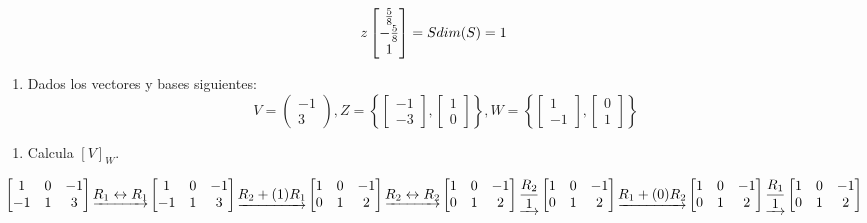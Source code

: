 \documentclass[
  11,
]{article}
\providecommand{\tightlist}{%
  \setlength{\itemsep}{0pt}\setlength{\parskip}{0pt}}
\begin{document}
\[
  z\begin{bmatrix}\frac{5}{8} \\ -\frac{5}{8} \\1\end{bmatrix} = S \\ dim(S) =1
  \]

\begin{enumerate}
\def\labelenumi{\arabic{enumi}.}
\setcounter{enumi}{4}
\tightlist
\item
  Dados los vectores y bases siguientes:
  \[V = \begin{pmatrix}-1\\3\end{pmatrix}, Z = \left\{ \begin{bmatrix}-1\\-3\end{bmatrix}, \begin{bmatrix}1\\0\end{bmatrix} \right\}, W = \left\{ \begin{bmatrix}1\\-1\end{bmatrix}, \begin{bmatrix}0\\1\end{bmatrix} \right\}\]
\end{enumerate}

\begin{enumerate}
\def\labelenumi{\alph{enumi})}
\tightlist
\item
  Calcula \([V]_W\).
\end{enumerate}

\[
  \left[\begin{matrix}1 & 0 & -1\\-1 & 1 & 3\end{matrix}\right]
\underrightarrow{ R_{1} \leftrightarrow R_{1} }
\left[\begin{matrix}1 & 0 & -1\\-1 & 1 & 3\end{matrix}\right]
\underrightarrow{ R_2 + (1)R_1 }
\left[\begin{matrix}1 & 0 & -1\\0 & 1 & 2\end{matrix}\right]
\underrightarrow{ R_{2} \leftrightarrow R_{2} }
\left[\begin{matrix}1 & 0 & -1\\0 & 1 & 2\end{matrix}\right]
\underrightarrow{ \frac{R_2}{1} }
\left[\begin{matrix}1 & 0 & -1\\0 & 1 & 2\end{matrix}\right]
\underrightarrow{ R_1 + (0)R_2 }
\\
\left[\begin{matrix}1 & 0 & -1\\0 & 1 & 2\end{matrix}\right]
\underrightarrow{ \frac{R_1}{1} }
\left[\begin{matrix}1 & 0 & -1\\0 & 1 & 2\end{matrix}\right]
\]
\end{document}
